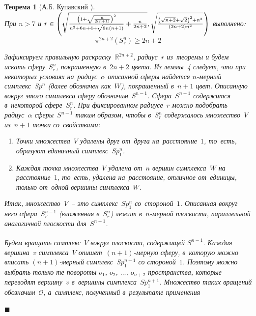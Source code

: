 \documentclass{report}%
\newtheorem{theorem}{Теорема}
\newenvironment{proof}{\par\noindent{\bf Доказательство.}}{\hfill$\scriptstyle\blacksquare$}
\begin{document}
\begin{theorem}[А.Б. Купавский \cite{Kupavsky2011}]~\\
		При $n > 7$ и
		$r \in \left(\sqrt{\frac{\left(1+\sqrt{\frac{\vphantom{2} n}{2(n+1)}}\right)^2}{n^2+6n+4+\sqrt{8n(n+1)}}+\frac{n}{2n+2}},
													\sqrt{\vphantom{\frac{\left(1+\sqrt{\frac{n}{2(n+1)}}\right)^2}{n^2+6n+4+\sqrt{8n(n+1)}}} \frac{\left(\sqrt{\vphantom{2} n+2} + \sqrt{\vphantom{n+} 2}\right)^2+n^3}{(2n+2)n^2}}\right)$ выполнено:
		\begin{equation}
				\pi^{2n+2}(S_r^n) \geq 2n+2
		\end{equation}
		\begin{proof}
				Зафиксируем правильную раскраску~$\mathbb{R}^{2n+2}$, радиус~$r$ из~теоремы и будем искать сферу~$S_r^n$,
				покрашенную в~$2n+2$ цвета. Из леммы~4 следует,
				что при некоторых условиях на~радиус~$\alpha$ описанной сферы найдется $n$-мерный симплекс~$Sp^n$ (далее обозначен как~$W$),
				покрашенный в~$n+1$ цвет. Описанную вокруг этого симплекса сферу обозначим~$S^{n-1}$.
				Сфера~$S^{n-1}$ содержится в~некоторой сфере~$S_r^n$.
				При фиксированном радиусе~$r$ можно подобрать радиус~$\alpha$ сферы~$S^{n-1}$ таким образом,
				чтобы в~$S_r^n$ содержалось множество~$V$ из~$n + 1$ точки со~свойствами:
				\begin{enumerate}
						\item Точки множества~$V$ удалены друг от~друга на~расстояние~$1$, то~есть, образуют единичный симплекс~$Sp_1^n$.
						\item Каждая точка множества~$V$ удалена от~$n$ вершин симплекса~$W$ на расстояние~$1$,
									то~есть, удалена на~расстояние, отличное от~единицы, только от~одной вершины симплекса~$W$.
				\end{enumerate}
				Итак, множество~$V$~– это симплекс~$Sp_1^n$ со~стороной~$1$.
				Описанная вокруг него сфера~$S_{r'}^{n-1}$ (вложенная в~$S_r^n$) лежит в~$n$-мерной плоскости,
				параллельной аналогичной плоскости для~$S^{n-1}$.\\\\
				\noindent Будем вращать симплекс~$V$ вокруг плоскости, содержащей $S^{n-1}$.
				Каждая вершина~$v$ симплекса~$V$ опишет~$(n+1)$-мерную сферу,
				в~которую можно вписать $(n+1)$-мерный симплекс~$Sp_1^{n+1}$ со стороной~$1$.
				Поэтому можно выбрать только те повороты $o_1$, $o_2$, $\ldots$, $o_{n+2}$ пространства,
				которые переводят вершину~$v$ в~вершины симплекса~$Sp_1^{n+1}$.
				Множество таких вращений обозначим~$\mathcal{O}$, а~симплекс, полученный в~результате применения

\end{proof}
\end{theorem}
\end{document}
